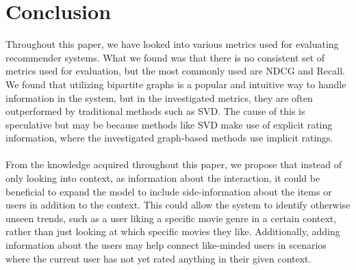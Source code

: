 \section{Conclusion}\label{sec:conclusion}
Throughout this paper, we have looked into various metrics used for evaluating recommender systems. What we found was that there is no consistent set of metrics used for evaluation, but the most commonly used are NDCG and Recall.
We found that utilizing bipartite graphs is a popular and intuitive way to handle information in the system, but in the investigated metrics, they are often outperformed by traditional methods such as SVD.
The cause of this is speculative but may be because methods like SVD make use of explicit rating information, where the investigated graph-based methods use implicit ratings.
\\\\
From the knowledge acquired throughout this paper, we propose that instead of only looking into context, as information about the interaction, it could be beneficial to expand the model to include side-information about the items or users in addition to the context.
This could allow the system to identify otherwise unseen trends, such as a user liking a specific movie genre in a certain context, rather than just looking at which specific movies they like.
Additionally, adding information about the users may help connect like-minded users in scenarios where the current user has not yet rated anything in their given context.

